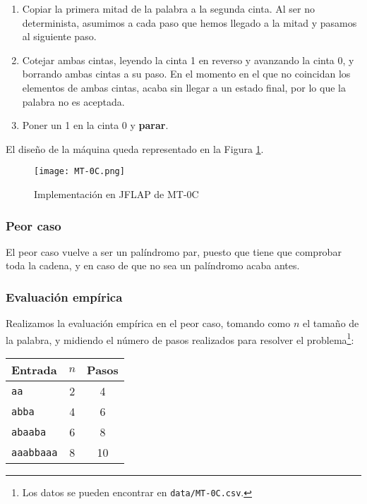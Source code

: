 \begin{enumerate}
    \item Copiar la primera mitad de la palabra a la segunda cinta. Al ser no determinista, asumimos a cada paso que hemos llegado a la mitad y pasamos al siguiente paso.
    \item Cotejar ambas cintas, leyendo la cinta 1 en reverso y avanzando la cinta 0, y borrando ambas cintas a su paso. En el momento en el que no coincidan los elementos de ambas cintas, acaba sin llegar a un estado final, por lo que la palabra no es aceptada.
    \item Poner un 1 en la cinta 0 y \textbf{parar}.
\end{enumerate}

El diseño de la máquina queda representado en la Figura \ref{fig:MT-0C}.

\begin{figure}[h]
    \centering
    \texttt{[image: MT-0C.png]}
    \caption{Implementación en JFLAP de MT-0C}
    \label{fig:MT-0C}
\end{figure}

\subsubsection*{Peor caso}
El peor caso vuelve a ser un palíndromo par, puesto que tiene que comprobar toda la cadena, y en caso de que no sea un palíndromo acaba antes.


\subsubsection*{Evaluación empírica}
Realizamos la evaluación empírica en el peor caso, tomando como $n$ el tamaño de la palabra, y midiendo el número de pasos realizados para resolver el problema\footnote{Los datos se pueden encontrar en \texttt{data/MT-0C.csv}.}:

\begin{table}[h]
    \centering
    \begin{tabular}{lcc}
        Entrada & $n$ & Pasos \\
        \hline
        \texttt{aa}             & 2  & 4 \\
        \texttt{abba}           & 4  & 6 \\
        \texttt{abaaba}         & 6  & 8 \\
        \texttt{aaabbaaa}       & 8  & 10 \\
    \end{tabular}
\end{table}

